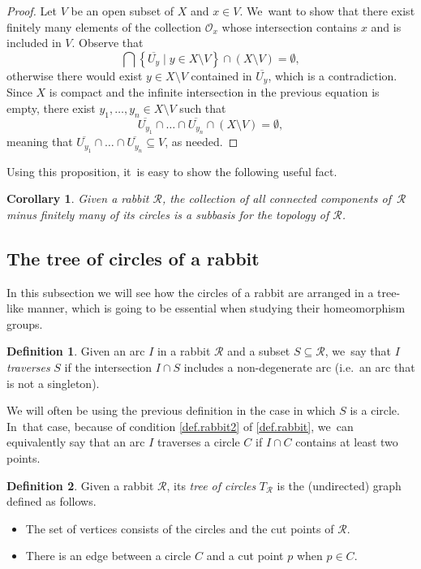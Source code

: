 \documentclass[10pt,a4paper]{amsart}
\newcommand{\ie}{i.e.\ }
\newtheorem{corollary}[corollary]{Corollary}
\theoremstyle{definition}
\newtheorem{definition}[definition]{Definition}
\newcommand{\R}{\mathcal{R}}
\begin{document}
\begin{proof}
Let $V$ be an open subset of $X$ and $x \in V$. We~want to show that there exist finitely many elements of the collection $\mathcal{O}_x$ whose intersection contains $x$ and is included in $V$.
Observe that
\[
 \bigcap \left\{ \overline{U_y} \mid y \in X \setminus V \right\} \cap (X \setminus V) = \emptyset, 
\]
otherwise there would exist $y \in X \setminus V$ contained in $\overline{U_y}$, which is a contradiction.
Since $X$ is compact and the infinite intersection in the previous equation is empty, there exist $y_1, \dots, y_n \in X \setminus V$ such that
\[
 \overline{U_{y_1}} \cap \dots \cap \overline{U_{y_n}} \cap (X \setminus V) = \emptyset, 
\]
meaning that $\overline{U_{y_1}} \cap \dots \cap \overline{U_{y_n}} \subseteq V$, as needed.
\end{proof}

Using this proposition, it~is easy to show the following useful fact.

\begin{corollary}
\label{cor.rabbit.subbasis}
Given a rabbit $\R$, the collection of all connected components of~$\R$ minus finitely many of its circles is a subbasis for the topology of $\R$.
\end{corollary}

\subsection{The tree of circles of a rabbit}\label{sec.tree.circles.rabbit}

In this subsection we will see how the circles of a rabbit are arranged in a tree-like manner, which is going to be essential when studying their homeomorphism groups.

\begin{definition}
\label{def.traverse}
Given an arc $I$ in a rabbit $\R$ and a subset $S \subseteq \R$, we~say that $I$ \emph{traverses} $S$ if the intersection $I \cap S$ includes a non-degenerate arc (\ie an arc that is not a singleton).
\end{definition}

We will often be using the previous definition in the case in which $S$ is a circle. In~that case, because of condition \cref{def.rabbit2} of \cref{def.rabbit}, we~can equivalently say that an arc $I$ traverses a circle $C$ if $I \cap C$ contains at least two points.

\begin{definition}
\label{def.tree.of.circles}
Given a rabbit $\R$, its \emph{tree of circles} $T_\R$ is the (undirected) graph defined as follows.
\begin{itemize}
\item The set of vertices consists of the circles and the cut points of $\R$.
\item There is an edge between a circle $C$ and a cut point $p$ when $p \in C$.
\end{itemize}
\end{definition}
\end{document}
